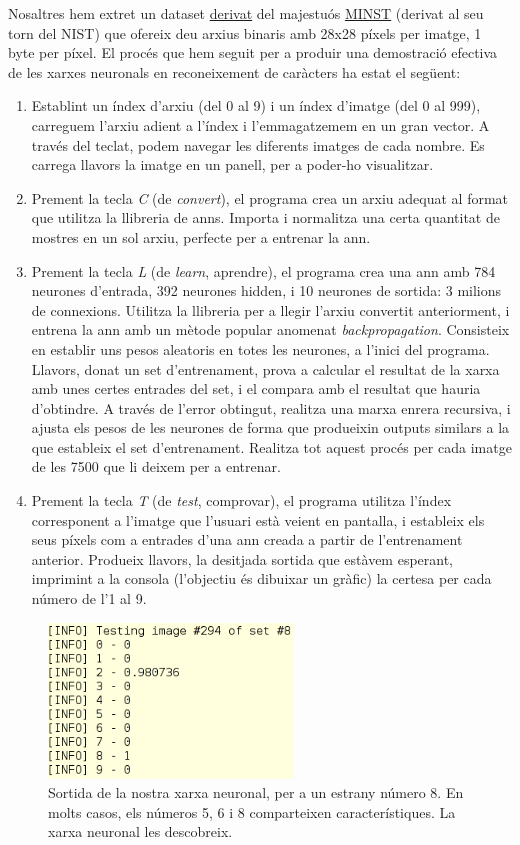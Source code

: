 Nosaltres hem extret un dataset \href{http://cis.jhu.edu/~sachin/digit/digit.html}{derivat} del majestuós \href{http://yann.lecun.com/exdb/mnist/}{MINST} (derivat al seu torn del NIST)
que ofereix deu arxius binaris amb 28x28 píxels per imatge, 1 byte per píxel. El procés que hem seguit per a produir una demostració efectiva de les 
xarxes neuronals en reconeixement de caràcters ha estat el següent:

\begin{enumerate}
\item Establint un índex d'arxiu (del 0 al 9) i un índex d'imatge (del 0 al 999), carreguem l'arxiu adient a l'índex i l'emmagatzemem en un gran vector. A través del teclat, podem
navegar les diferents imatges de cada nombre. Es carrega llavors la imatge en un panell, per a poder-ho visualitzar.
\item Prement la tecla \emph{C} (de \emph{convert}), el programa crea un arxiu adequat al format que utilitza la llibreria de \ac{ann}s. Importa i normalitza una certa quantitat 
de mostres en un sol arxiu, perfecte per a entrenar la \ac{ann}.
\item Prement la tecla \emph{L} (de \emph{learn}, aprendre), el programa crea una \ac{ann} amb 784 neurones d'entrada, 392 neurones hidden, i 10 neurones de sortida: 3 milions de connexions. Utilitza la 
llibreria per a llegir l'arxiu convertit anteriorment, i entrena la \ac{ann} amb un mètode popular anomenat \emph{backpropagation}. Consisteix en establir uns pesos aleatoris 
en totes les neurones, a l'inici del programa. Llavors, donat un set d'entrenament, prova a calcular el resultat de la xarxa amb unes certes entrades del set, i el compara amb el resultat
que hauria d'obtindre. A través de l'error obtingut, realitza una marxa enrera recursiva, i ajusta els pesos de les neurones de forma que produeixin outputs similars a la que
estableix el set d'entrenament. Realitza tot aquest procés per cada imatge de les 7500 que li deixem per a entrenar.
\item Prement la tecla \emph{T} (de \emph{test}, comprovar), el programa utilitza l'índex corresponent a l'imatge que l'usuari està veient en pantalla, i estableix els seus píxels
com a entrades d'una \ac{ann} creada a partir de l'entrenament anterior. Produeix llavors, la desitjada sortida que estàvem esperant, imprimint a la consola (l'objectiu és dibuixar un gràfic)
la certesa per cada número de l'1 al 9.
\end{enumerate}


\begin{figure}[ht!]
\centering
\includegraphics[width=65mm]{data/outtest.png}
\caption{Sortida de la nostra xarxa neuronal, per a un estrany número 8. En molts casos, els números 5, 6 i 8 comparteixen característiques. La xarxa neuronal les descobreix.}
\label{output}
\end{figure}

